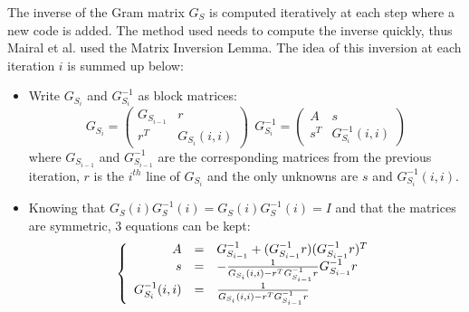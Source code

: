 \documentclass{ipol}
\begin{document}
\noindent The inverse of the Gram matrix $G_S$ is computed iteratively at each step where a new code is added. The method used needs to compute the inverse quickly, thus Mairal et al. used the Matrix Inversion Lemma. The idea of this inversion at each iteration $i$ is summed up below:
\begin{itemize}
	\item Write $G_{S_i}$ and $G_{S_i}^{-1}$ as block matrices: \\
\begin{equation*}
	G_{S_i} = 
	\begin{pmatrix}
   		G_{S_{i-1}} & r \\
   		r^T & G_{S_i}(i,i) 
	\end{pmatrix}
	\ \ G_{S_i}^{-1} =
	\begin{pmatrix}
   		A & s \\
   		s^T & G_{S_i}^{-1}(i,i) 
	\end{pmatrix}
\end{equation*}	
	where $G_{S_{i-1}}$ and $G_{S_{i-1}}^{-1}$ are the corresponding matrices from the previous iteration, $r$ is the $i^{th}$ line of $G_{S_i}$ and the only unknowns are $s$ and $G_{S_i}^{-1}(i,i)$.
	\item Knowing that $G_S(i)G_S^{-1}(i) = G_S(i)G_S^{-1}(i) = I$ and that the matrices are symmetric, 3 equations can be kept:
\begin{equation*}
	\left \{
   	\begin{array}{r c l}
   		A					& = &	G_{S_{i-1}}^{-1} + (G_{S_{i-1}}^{-1} r) (G_{S_{i-1}}^{-1} r)^T\\
      	s  					& = &	-\frac{1}{G_{S_i}(i,i) - r^T G_{S_{i-1}}^{-1} r} G_{S_{i-1}}^{-1} r\\
      	G_{S_i}^{-1}(i,i)	& = &	\frac{1}{G_{S_i}(i,i) - r^T G_{S_{i-1}}^{-1} r}
   	\end{array}
   	\right .
\end{equation*}
\end{itemize}
\end{document}
